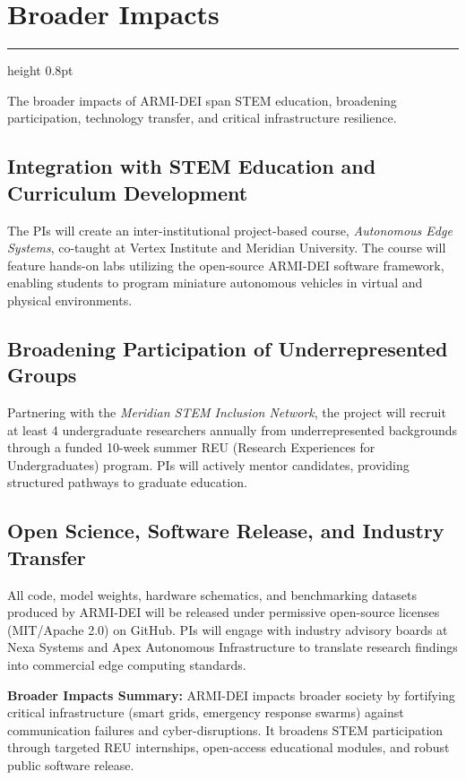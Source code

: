 \documentclass[11pt,letterpaper]{scrartcl}
\newcommand{\sectionline}{%
  \vspace{-0.5em}%
  {\color{NSFNavy}\hrule height 0.8pt}%
  \vspace{0.2em}%
}
\begin{document}
\section{Broader Impacts}
\sectionline

The broader impacts of ARMI-DEI span STEM education, broadening participation, technology transfer, and critical infrastructure resilience.

\subsection{Integration with STEM Education and Curriculum Development}
The PIs will create an inter-institutional project-based course, \emph{Autonomous Edge Systems}, co-taught at Vertex Institute and Meridian University. The course will feature hands-on labs utilizing the open-source ARMI-DEI software framework, enabling students to program miniature autonomous vehicles in virtual and physical environments.

\subsection{Broadening Participation of Underrepresented Groups}
Partnering with the \emph{Meridian STEM Inclusion Network}, the project will recruit at least 4 undergraduate researchers annually from underrepresented backgrounds through a funded 10-week summer REU (Research Experiences for Undergraduates) program. PIs will actively mentor candidates, providing structured pathways to graduate education.

\subsection{Open Science, Software Release, and Industry Transfer}
All code, model weights, hardware schematics, and benchmarking datasets produced by ARMI-DEI will be released under permissive open-source licenses (MIT/Apache 2.0) on GitHub. PIs will engage with industry advisory boards at Nexa Systems and Apex Autonomous Infrastructure to translate research findings into commercial edge computing standards.

\begin{tcolorbox}[impactbox]
\textbf{Broader Impacts Summary:} ARMI-DEI impacts broader society by fortifying critical infrastructure (smart grids, emergency response swarms) against communication failures and cyber-disruptions. It broadens STEM participation through targeted REU internships, open-access educational modules, and robust public software release.
\end{tcolorbox}
\end{document}
